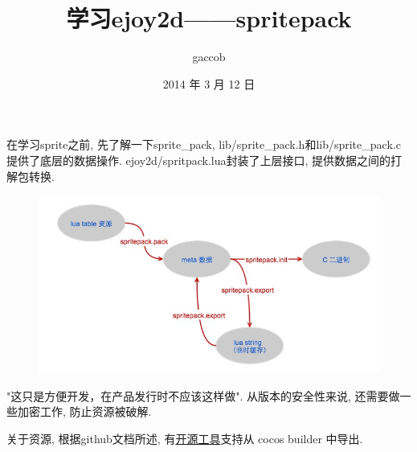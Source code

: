

\title {\ZHH \huge 学习ejoy2d——spritepack}
\author {\small gaccob}
\date {\small 2014 年 3 月 12 日}
\maketitle

{在学习sprite之前, 先了解一下sprite\_pack, lib/sprite\_pack.h和lib/sprite\_pack.c提供了底层的数据操作. ejoy2d/spritpack.lua封装了上层接口, 提供数据之间的打解包转换.}\par

\begin {figure}[htbp]
    \centering
    \includegraphics [width=350pt, keepaspectratio] {sprite_pack.jpg}
\end {figure}

{"这只是方便开发，在产品发行时不应该这样做". 从版本的安全性来说, 还需要做一些加密工作, 防止资源被破解. }\par

{关于资源, 根据github文档所述, 有\href{https://github.com/robinxb/flash-parser}{开源工具}支持从 cocos builder 中导出. }\par

